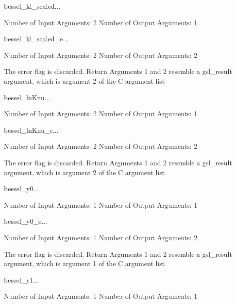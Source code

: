 \begin{funcdesc}{bessel_kl_scaled}{...}

    Number of Input  Arguments:  2
    Number of Output Arguments:  1
\end{funcdesc}

\begin{funcdesc}{bessel_kl_scaled_e}{...}

    Number of Input  Arguments:  2
    Number of Output Arguments:  2

The error flag is discarded.
Return Arguments 1 and 2 resemble a gsl_result argument,
	which is  argument 2 of the C argument list

\end{funcdesc}

\begin{funcdesc}{bessel_lnKnu}{...}

    Number of Input  Arguments:  2
    Number of Output Arguments:  1
\end{funcdesc}

\begin{funcdesc}{bessel_lnKnu_e}{...}

    Number of Input  Arguments:  2
    Number of Output Arguments:  2

The error flag is discarded.
Return Arguments 1 and 2 resemble a gsl_result argument,
	which is  argument 2 of the C argument list

\end{funcdesc}

\begin{funcdesc}{bessel_y0}{...}

    Number of Input  Arguments:  1
    Number of Output Arguments:  1
\end{funcdesc}

\begin{funcdesc}{bessel_y0_e}{...}

    Number of Input  Arguments:  1
    Number of Output Arguments:  2

The error flag is discarded.
Return Arguments 1 and 2 resemble a gsl_result argument,
	which is  argument 1 of the C argument list

\end{funcdesc}

\begin{funcdesc}{bessel_y1}{...}

    Number of Input  Arguments:  1
    Number of Output Arguments:  1
\end{funcdesc}

